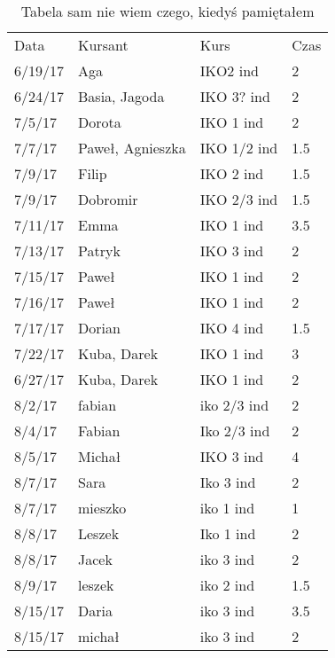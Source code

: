 \documentclass{article}
\begin{document}
	
	\begin{table}[]
		\centering
		\begin{tabular}{llll}
Data    & Kursant          & Kurs         & Czas  \\
6/19/17 & Aga              & IKO2 ind     & 2     \\
6/24/17 & Basia, Jagoda    & IKO 3? ind   & 2     \\
7/5/17  & Dorota           & IKO 1 ind    & 2     \\
7/7/17  & Paweł, Agnieszka & IKO 1/2 ind  & 1.5   \\
7/9/17  & Filip            & IKO 2 ind    & 1.5   \\
7/9/17  & Dobromir         & IKO 2/3 ind  & 1.5   \\
7/11/17 & Emma             & IKO 1 ind    & 3.5   \\
7/13/17 & Patryk           & IKO 3 ind    & 2     \\
7/15/17 & Paweł            & IKO 1 ind    & 2     \\
7/16/17 & Paweł            & IKO 1 ind    & 2     \\
7/17/17 & Dorian           & IKO 4 ind    & 1.5   \\
7/22/17 & Kuba, Darek      & IKO 1 ind    & 3     \\
6/27/17 & Kuba, Darek      & IKO 1 ind    & 2     \\
8/2/17  & fabian           & iko 2/3 ind  & 2     \\
8/4/17  & Fabian           & Iko 2/3 ind  & 2     \\
8/5/17  & Michał           & IKO 3 ind    & 4     \\
8/7/17  & Sara             & Iko 3 ind    & 2     \\
8/7/17  & mieszko          & iko 1 ind    & 1     \\
8/8/17  & Leszek           & Iko 1 ind    & 2     \\
8/8/17  & Jacek            & iko 3 ind    & 2     \\
8/9/17  & leszek           & iko 2 ind    & 1.5   \\
8/15/17 & Daria            & iko 3 ind    & 3.5   \\
8/15/17 & michał           & iko 3 ind    & 2     
		\end{tabular}
		
	\caption{Tabela sam nie wiem czego, kiedyś pamiętałem}
	\label{table:tablica}
	\end{table}
	
\end{document}

